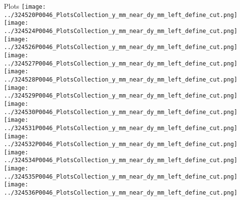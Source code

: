 \documentclass{beamer}
\begin{document}
\begin{frame}
\begin{block}{Plots}
                \texttt{[image: ../324520P0046\_PlotsCollection\_y\_mm\_near\_dy\_mm\_left\_define\_cut.png]}
                \texttt{[image: ../324524P0046\_PlotsCollection\_y\_mm\_near\_dy\_mm\_left\_define\_cut.png]}
                \texttt{[image: ../324526P0046\_PlotsCollection\_y\_mm\_near\_dy\_mm\_left\_define\_cut.png]}
                \texttt{[image: ../324527P0046\_PlotsCollection\_y\_mm\_near\_dy\_mm\_left\_define\_cut.png]}\\
                \texttt{[image: ../324528P0046\_PlotsCollection\_y\_mm\_near\_dy\_mm\_left\_define\_cut.png]}
                \texttt{[image: ../324529P0046\_PlotsCollection\_y\_mm\_near\_dy\_mm\_left\_define\_cut.png]}
                \texttt{[image: ../324530P0046\_PlotsCollection\_y\_mm\_near\_dy\_mm\_left\_define\_cut.png]}
                \texttt{[image: ../324531P0046\_PlotsCollection\_y\_mm\_near\_dy\_mm\_left\_define\_cut.png]}
                \texttt{[image: ../324532P0046\_PlotsCollection\_y\_mm\_near\_dy\_mm\_left\_define\_cut.png]}\\
                \texttt{[image: ../324534P0046\_PlotsCollection\_y\_mm\_near\_dy\_mm\_left\_define\_cut.png]}
                \texttt{[image: ../324535P0046\_PlotsCollection\_y\_mm\_near\_dy\_mm\_left\_define\_cut.png]}
                \texttt{[image: ../324536P0046\_PlotsCollection\_y\_mm\_near\_dy\_mm\_left\_define\_cut.png]}

        \end{block}
\end{frame}
\end{document}
